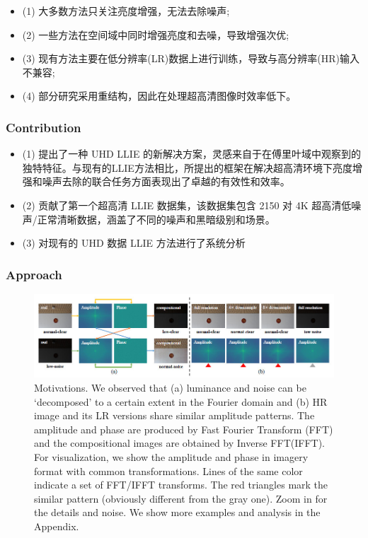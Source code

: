 \documentclass[letterpaper,10pt]{article}
\begin{document}
	\begin{itemize}
		\item {}
			(1) 大多数方法只关注亮度增强，无法去除噪声;
		\item {}
			(2) 一些方法在空间域中同时增强亮度和去噪，导致增强次优;
		\item {}
			(3) 现有方法主要在低分辨率(LR)数据上进行训练，导致与高分辨率(HR)输入不兼容;
		\item {}
			(4) 部分研究采用重结构，因此在处理超高清图像时效率低下。
	\end{itemize}
		
	\subsubsection{Contribution}

	\begin{itemize}
		\item {}
			(1) 提出了一种 UHD LLIE 的新解决方案，灵感来自于在傅里叶域中观察到的独特特征。与现有的LLIE方法相比，所提出的框架在解决超高清环境下亮度增强和噪声去除的联合任务方面表现出了卓越的有效性和效率。
		\item {}
			(2) 贡献了第一个超高清 LLIE 数据集，该数据集包含 2150 对 4K 超高清低噪声/正常清晰数据，涵盖了不同的噪声和黑暗级别和场景。
		\item {}
			(3) 对现有的 UHD 数据 LLIE 方法进行了系统分析
	\end{itemize}
	
	\subsubsection{Approach}
	
	\begin{figure}[htbp]
		\centering 
		\includegraphics[width=0.8\columnwidth]{picture/Motivations}
		\caption{
			\label{fig: Motivations} Motivations. We observed that (a) luminance and noise can be ‘decomposed’ to a certain extent in the Fourier domain and (b) HR image and its LR versions share similar amplitude patterns. The amplitude and phase are produced by Fast Fourier Transform (FFT) and the compositional images are obtained by Inverse FFT(IFFT). For visualization, we show the amplitude and phase in imagery format with common transformations. Lines of the same color indicate a set of FFT/IFFT transforms. The red triangles mark the similar pattern (obviously different from the gray one). Zoom in for the details and noise. We show more examples and analysis in the Appendix.
		}
	\end{figure}
	
\end{document}
